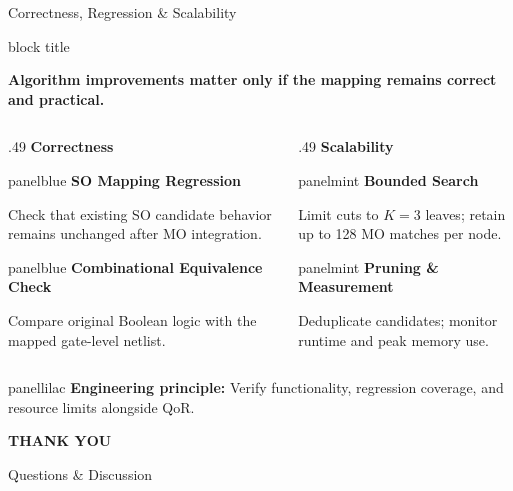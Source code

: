 \documentclass[aspectratio=169,10pt]{beamer}
\newcommand{\takeaway}[1]{%
  \begin{beamercolorbox}[rounded=true,sep=0.13cm,wd=\linewidth]{block title}%
    \raggedright\strut\textbf{#1}\strut
  \end{beamercolorbox}%
}
\newcommand{\softpanel}[3]{%
  \begin{beamercolorbox}[rounded=true,sep=0.16cm,wd=\linewidth]{#1}%
  {\small\bfseries\color{Accent}#2}\par\vspace{0.06cm}
  {\small\color{Ink}#3}
  \end{beamercolorbox}%
}
\begin{document}
\begin{frame}{Correctness, Regression \& Scalability}
  \takeaway{Algorithm improvements matter only if the mapping remains correct and practical.}
  \vspace{.24cm}
  \begin{columns}[T,onlytextwidth]
  \begin{column}{.49\textwidth}
     {\large\bfseries\color{AccentBlue}Correctness}\par\vspace{.18cm}
     \softpanel{panelblue}{SO Mapping Regression}{Check that existing SO candidate behavior remains unchanged after MO integration.}
     \vspace{.16cm}
     \softpanel{panelblue}{Combinational Equivalence Check}{Compare original Boolean logic with the mapped gate-level netlist.}
  \end{column}
  \begin{column}{.49\textwidth}
     {\large\bfseries\color{Accent}Scalability}\par\vspace{.18cm}
     \softpanel{panelmint}{Bounded Search}{Limit cuts to $K=3$ leaves; retain up to 128 MO matches per node.}
     \vspace{.16cm}
     \softpanel{panelmint}{Pruning \& Measurement}{Deduplicate candidates; monitor runtime and peak memory use.}
  \end{column}
  \end{columns}
  \vspace{.10cm}
  \begin{beamercolorbox}[rounded=true,sep=.12cm,wd=\linewidth]{panellilac}
    {\small\bfseries\color{Ink}Engineering principle:} {\small Verify functionality, regression coverage, and resource limits alongside QoR.}
  \end{beamercolorbox}
\end{frame}

{
\begin{frame}[plain]
  \centering
  \vfill
  {\fontsize{36}{42}\selectfont\bfseries\color{Ink}THANK YOU}\par
  \vspace{.37cm}
  {\fontsize{19}{24}\selectfont\color{Muted}Questions \& Discussion}\par
  \vfill
\end{frame}}
\end{document}
